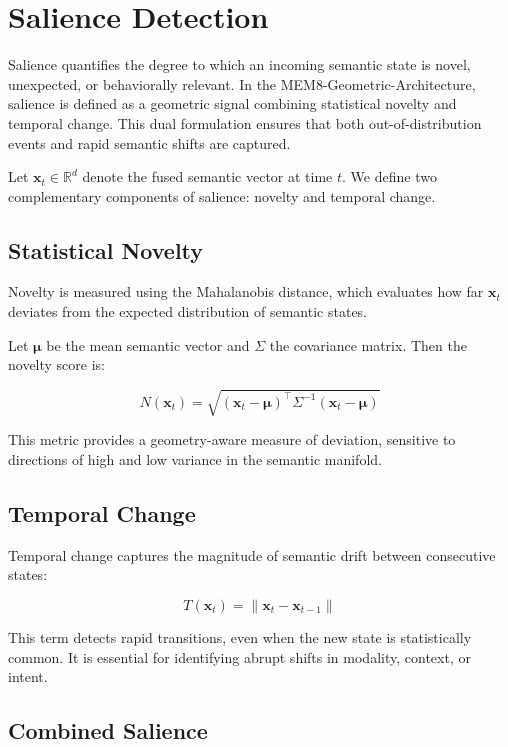 \section{Salience Detection}

Salience quantifies the degree to which an incoming semantic state is novel,
unexpected, or behaviorally relevant. In the MEM8-Geometric-Architecture,
salience is defined as a geometric signal combining statistical novelty and
temporal change. This dual formulation ensures that both out-of-distribution
events and rapid semantic shifts are captured.

Let $\mathbf{x}_t \in \mathbb{R}^d$ denote the fused semantic vector at time $t$.
We define two complementary components of salience: novelty and temporal change.

\subsection{Statistical Novelty}

Novelty is measured using the Mahalanobis distance, which evaluates how far
$\mathbf{x}_t$ deviates from the expected distribution of semantic states.

Let $\bm{\mu}$ be the mean semantic vector and $\Sigma$ the covariance matrix.
Then the novelty score is:

\[
N(\mathbf{x}_t) =
\sqrt{(\mathbf{x}_t - \bm{\mu})^\top \Sigma^{-1}
(\mathbf{x}_t - \bm{\mu})}
\]

This metric provides a geometry-aware measure of deviation, sensitive to
directions of high and low variance in the semantic manifold.

\subsection{Temporal Change}

Temporal change captures the magnitude of semantic drift between consecutive
states:

\[
T(\mathbf{x}_t) = \|\mathbf{x}_t - \mathbf{x}_{t-1}\|
\]

This term detects rapid transitions, even when the new state is statistically
common. It is essential for identifying abrupt shifts in modality, context, or
intent.

\subsection{Combined Salience}

